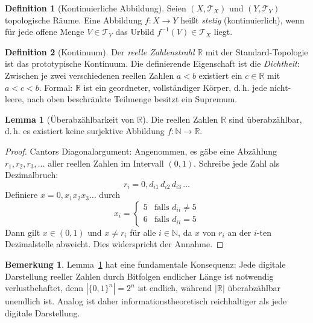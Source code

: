 ﻿\documentclass[a4paper,12pt]{article}
\theoremstyle{definition}
\newtheorem{definition}{Definition}
\newtheorem{lemma}{Lemma}
\newtheorem{bemerkung}{Bemerkung}
\begin{document}
\begin{definition}[Kontinuierliche Abbildung]
Seien $(X,\mathcal{T}_X)$ und $(Y,\mathcal{T}_Y)$ topologische Räume.
Eine Abbildung $f: X \to Y$ heißt \emph{stetig} (kontinuierlich), wenn für jede offene
Menge $V \in \mathcal{T}_Y$ das Urbild $f^{-1}(V) \in \mathcal{T}_X$ liegt.
\end{definition}

\begin{definition}[Kontinuum]
Der \emph{reelle Zahlenstrahl} $\mathbb{R}$ mit der Standard-Topologie ist das
prototypische Kontinuum.  Die definierende Eigenschaft ist die
\emph{Dichtheit}: Zwischen je zwei verschiedenen reellen Zahlen $a < b$
existiert ein $c \in \mathbb{R}$ mit $a < c < b$.
Formal: $\mathbb{R}$ ist ein geordneter, vollständiger Körper, d.\,h. jede
nicht-leere, nach oben beschränkte Teilmenge besitzt ein Supremum.
\end{definition}

\begin{lemma}[Überabzählbarkeit von $\mathbb{R}$]
\label{lem:ueberabzaehlbar}
Die reellen Zahlen $\mathbb{R}$ sind überabzählbar, d.\,h. es existiert keine
surjektive Abbildung $f: \mathbb{N} \to \mathbb{R}$.
\end{lemma}

\begin{proof}
Cantors Diagonalargument: Angenommen, es gäbe eine Abzählung
$r_1, r_2, r_3, \ldots$ aller reellen Zahlen im Intervall $(0,1)$.
Schreibe jede Zahl als Dezimalbruch:
\[
r_i = 0{,}d_{i1}\, d_{i2}\, d_{i3}\, \ldots
\]
Definiere $x = 0{,}x_1 x_2 x_3 \ldots$ durch
\[
x_i = \begin{cases} 5 & \text{falls } d_{ii} \neq 5 \\ 6 & \text{falls } d_{ii} = 5 \end{cases}
\]
Dann gilt $x \in (0,1)$ und $x \neq r_i$ für alle $i \in \mathbb{N}$, da $x$ von $r_i$
an der $i$-ten Dezimalstelle abweicht.  Dies widerspricht der Annahme.
\end{proof}

\begin{bemerkung}
Lemma~\ref{lem:ueberabzaehlbar} hat eine fundamentale Konsequenz:
Jede digitale Darstellung reeller Zahlen durch Bitfolgen endlicher Länge ist notwendig
verlustbehaftet, denn $|\{0,1\}^n| = 2^n$ ist endlich, während $|\mathbb{R}|$ überabzählbar
unendlich ist.  Analog ist daher informationstheoretisch reichhaltiger als jede digitale
Darstellung.
\end{bemerkung}
\end{document}
